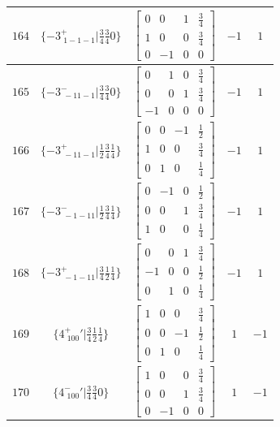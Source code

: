 \documentclass[fleqn,8pt]{jsarticle}
\begin{document}
\begin{longtable}{ccccc}
$ 164 $ & $ \{-3^{+}_{\,\,1-1-1}|\frac{3}{4} \frac{3}{4} 0\} $ & $ \begin{bmatrix} 0 & 0 & 1 & \frac{3}{4} \\ 1 & 0 & 0 & \frac{3}{4} \\ 0 & -1 & 0 & 0 \end{bmatrix} $ & $ -1 $ & $ 1 $ \\ \hline
$ 165 $ & $ \{-3^{-}_{\,\,-11-1}|\frac{3}{4} \frac{3}{4} 0\} $ & $ \begin{bmatrix} 0 & 1 & 0 & \frac{3}{4} \\ 0 & 0 & 1 & \frac{3}{4} \\ -1 & 0 & 0 & 0 \end{bmatrix} $ & $ -1 $ & $ 1 $ \\ \hline
$ 166 $ & $ \{-3^{+}_{\,\,-11-1}|\frac{1}{2} \frac{3}{4} \frac{1}{4}\} $ & $ \begin{bmatrix} 0 & 0 & -1 & \frac{1}{2} \\ 1 & 0 & 0 & \frac{3}{4} \\ 0 & 1 & 0 & \frac{1}{4} \end{bmatrix} $ & $ -1 $ & $ 1 $ \\ \hline
$ 167 $ & $ \{-3^{-}_{\,\,-1-11}|\frac{1}{2} \frac{3}{4} \frac{1}{4}\} $ & $ \begin{bmatrix} 0 & -1 & 0 & \frac{1}{2} \\ 0 & 0 & 1 & \frac{3}{4} \\ 1 & 0 & 0 & \frac{1}{4} \end{bmatrix} $ & $ -1 $ & $ 1 $ \\ \hline
$ 168 $ & $ \{-3^{+}_{\,\,-1-11}|\frac{3}{4} \frac{1}{2} \frac{1}{4}\} $ & $ \begin{bmatrix} 0 & 0 & 1 & \frac{3}{4} \\ -1 & 0 & 0 & \frac{1}{2} \\ 0 & 1 & 0 & \frac{1}{4} \end{bmatrix} $ & $ -1 $ & $ 1 $ \\ \hline
$ 169 $ & $ \{4^{+}_{\,\,100}{}'|\frac{3}{4} \frac{1}{2} \frac{1}{4}\} $ & $ \begin{bmatrix} 1 & 0 & 0 & \frac{3}{4} \\ 0 & 0 & -1 & \frac{1}{2} \\ 0 & 1 & 0 & \frac{1}{4} \end{bmatrix} $ & $ 1 $ & $ -1 $ \\ \hline
$ 170 $ & $ \{4^{-}_{\,\,100}{}'|\frac{3}{4} \frac{3}{4} 0\} $ & $ \begin{bmatrix} 1 & 0 & 0 & \frac{3}{4} \\ 0 & 0 & 1 & \frac{3}{4} \\ 0 & -1 & 0 & 0 \end{bmatrix} $ & $ 1 $ & $ -1 $ \\ \hline

\end{longtable}
\end{document}
